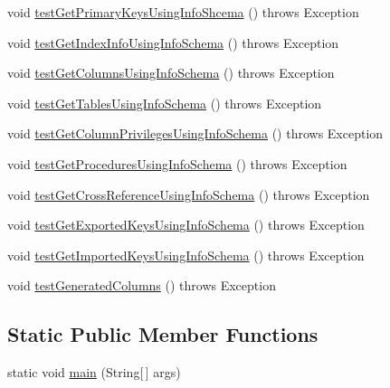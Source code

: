 \begin{DoxyCompactItemize}
\item 
void \mbox{\hyperlink{classtestsuite_1_1simple_1_1_metadata_test_aec0bf7b994940c84160bf6100daf09bd}{test\+Get\+Primary\+Keys\+Using\+Info\+Shcema}} ()  throws Exception 
\item 
void \mbox{\hyperlink{classtestsuite_1_1simple_1_1_metadata_test_ab4ebb88c45acf9e7ce6b2420037c0153}{test\+Get\+Index\+Info\+Using\+Info\+Schema}} ()  throws Exception 
\item 
void \mbox{\hyperlink{classtestsuite_1_1simple_1_1_metadata_test_a96ed59d14490afb4e9e39aa8414acd0a}{test\+Get\+Columns\+Using\+Info\+Schema}} ()  throws Exception 
\item 
void \mbox{\hyperlink{classtestsuite_1_1simple_1_1_metadata_test_a480ded9536c6ed0ec7ae1cc82bc75a9b}{test\+Get\+Tables\+Using\+Info\+Schema}} ()  throws Exception 
\item 
void \mbox{\hyperlink{classtestsuite_1_1simple_1_1_metadata_test_a732360d39fdbee06f425012c99944216}{test\+Get\+Column\+Privileges\+Using\+Info\+Schema}} ()  throws Exception 
\item 
void \mbox{\hyperlink{classtestsuite_1_1simple_1_1_metadata_test_a2b94ef57c9572c0d5351c4ca8201b677}{test\+Get\+Procedures\+Using\+Info\+Schema}} ()  throws Exception 
\item 
void \mbox{\hyperlink{classtestsuite_1_1simple_1_1_metadata_test_a5c35cdbd777234219930a906ee096e93}{test\+Get\+Cross\+Reference\+Using\+Info\+Schema}} ()  throws Exception 
\item 
void \mbox{\hyperlink{classtestsuite_1_1simple_1_1_metadata_test_ae23d4ce9f6bff53b3ea3033d6a7f82a7}{test\+Get\+Exported\+Keys\+Using\+Info\+Schema}} ()  throws Exception 
\item 
void \mbox{\hyperlink{classtestsuite_1_1simple_1_1_metadata_test_aaef304b87a16efa2655e6e93ca030117}{test\+Get\+Imported\+Keys\+Using\+Info\+Schema}} ()  throws Exception 
\item 
void \mbox{\hyperlink{classtestsuite_1_1simple_1_1_metadata_test_a27296d9b08d2b4d91aa016482c2cef68}{test\+Generated\+Columns}} ()  throws Exception 
\end{DoxyCompactItemize}
\subsection*{Static Public Member Functions}
\begin{DoxyCompactItemize}
\item 
static void \mbox{\hyperlink{classtestsuite_1_1simple_1_1_metadata_test_a8a06af1a7d28478dbe8d0b9ec2146908}{main}} (String\mbox{[}$\,$\mbox{]} args)
\end{DoxyCompactItemize}
